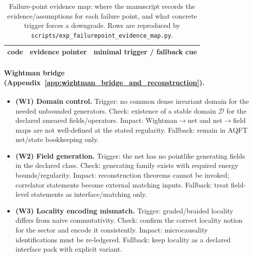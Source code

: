 \begin{table}[H]
\centering
\scriptsize
\setlength{\tabcolsep}{6pt}
\renewcommand{\arraystretch}{1.15}
\begin{tabular}{p{0.8cm} p{4.4cm} p{6.4cm}}
\toprule
code & evidence pointer & minimal trigger / fallback cue \\
\midrule
%
\end{tabular}
\caption{Failure-point evidence map: where the manuscript records the evidence/assumptions for each failure point, and what concrete trigger forces a downgrade. Rows are reproduced by \texttt{scripts/exp\_failurepoint\_evidence\_map.py}.}
\label{tab:failurepoint_evidence_map}
\end{table}

\paragraph{Wightman bridge (Appendix~\ref{app:wightman_bridge_and_reconstruction}).}
\begin{itemize}
\item \textbf{(W1) Domain control.}
  Trigger: no common dense invariant domain for the needed unbounded generators.
  Check: existence of a stable domain $\mathcal{D}$ for the declared smeared fields/operators.
  Impact: Wightman$\to$net and net$\to$field maps are not well-defined at the stated regularity.
  Fallback: remain in AQFT net/state bookkeeping only.
\item \textbf{(W2) Field generation.}
  Trigger: the net has no pointlike generating fields in the declared class.
  Check: generating family exists with required energy bounds/regularity.
  Impact: reconstruction theorems cannot be invoked; correlator statements become external matching inputs.
  Fallback: treat field-level statements as interface/matching only.
\item \textbf{(W3) Locality encoding mismatch.}
  Trigger: graded/braided locality differs from naive commutativity.
  Check: confirm the correct locality notion for the sector and encode it consistently.
  Impact: microcausality identifications must be re-ledgered.
  Fallback: keep locality as a declared interface pack with explicit variant.
\end{itemize}

